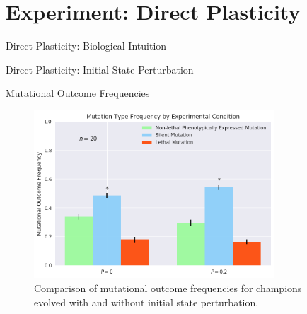 \section{Experiment: Direct Plasticity}

\begin{frame}{Direct Plasticity: Biological Intuition}
  
\end{frame}

\begin{frame}{Direct Plasticity: Initial State Perturbation}

\end{frame}

\begin{frame}{Mutational Outcome Frequencies}
\begin{figure}
    \centering
    \includegraphics[width=0.8\textwidth]{img/mutation_type_direct}
 	\captionsetup{singlelinecheck=off,justification=raggedright}
  	\caption{Comparison of mutational outcome frequencies for champions evolved with and without initial state perturbation.}
    \label{fig:mutation_type_direct}
\end{figure}
\end{frame}

